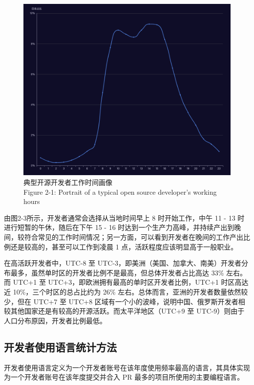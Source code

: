 \begin{figure}[H]
    \centering
    \includegraphics[width=130mm]{./figures/image2-3.png}
    \caption{ 典型开源开发者工作时间画像\\Figure 2-1: Portrait of a typical open source developer's working hours}
\end{figure}

\par 由图2-3所示，开发者通常会选择从当地时间早上 8 时开始工作，中午 11 - 13 时进行短暂的午休，随后在下午 15 - 16 时达到一个生产力高峰，并持续产出到晚间，较符合常见的工作时间情况；另一方面，可以看到开发者在晚间的工作产出比例还是较高的，甚至可以工作到凌晨 1 点，活跃程度应该明显高于一般职业。

\par 在高活跃开发者中，UTC-8 至 UTC-3，即美洲（美国、加拿大、南美）开发者分布最多，虽然单时区的开发者比例不是最高，但总体开发者占比高达 33\% 左右。而 UTC+1 至 UTC+3，即欧洲拥有最高的单时区开发者比例，UTC+1 时区高达近 10\%，三个时区的总占比约为 26\% 左右。总体而言，亚洲的开发者数量依然较少，但在 UTC+7 至 UTC+8 区域有一个小的波峰，说明中国、俄罗斯开发者相较其他国家还是有较高的开源活跃。而太平洋地区（UTC+9 至 UTC-9）则由于人口分布原因，开发者比例最低。


\subsection{开发者使用语言统计方法}
\par 开发者使用语言定义为一个开发者账号在该年度使用频率最高的语言，其具体实现为一个开发者账号在该年度提交并合入 PR 最多的项目所使用的主要编程语言。


